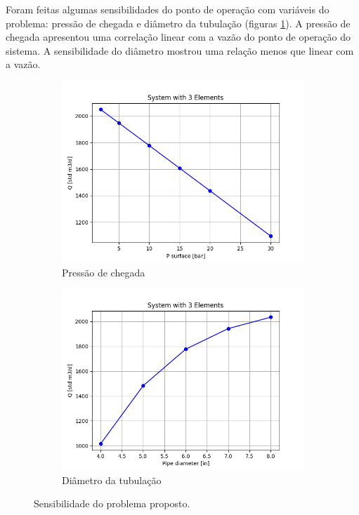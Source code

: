 \documentclass[final,3p]{elsarticle}
\numberwithin{equation}{section}
\begin{document}
        Foram feitas algumas sensibilidades do ponto de operação com variáveis do problema: pressão de chegada e diâmetro da tubulação (figuras \ref{fig:sensibilidade}). A pressão de chegada apresentou uma correlação linear com a vazão do ponto de operação do sistema. A sensibilidade do diâmetro mostrou uma relação menos que linear com a vazão.

        \begin{figure}
          \centering

          \begin{subfigure}{0.45\textwidth}
            \includegraphics[width=\textwidth]{flow/system1_p_out.png}
            \caption{Pressão de chegada}
          \end{subfigure}
          \hfill
          \begin{subfigure}{0.45\textwidth}
            \includegraphics[width=\textwidth]{flow/system1_d.png}
            \caption{Diâmetro da tubulação}
          \end{subfigure}

          \caption{Sensibilidade do problema proposto.}
          \label{fig:sensibilidade}
        \end{figure}
\end{document}
